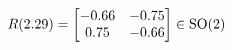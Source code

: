 \documentclass[preview]{standalone}
\begin{document}
\begin{align*}
\special{dvisvgm:raw <g id='unique000'>}R(2.29) = \begin{bmatrix} -0.66 & -0.75 \\ 0.75 & -0.66 \end{bmatrix} \in \text{SO}(2)\special{dvisvgm:raw </g>}
\end{align*}
\end{document}
